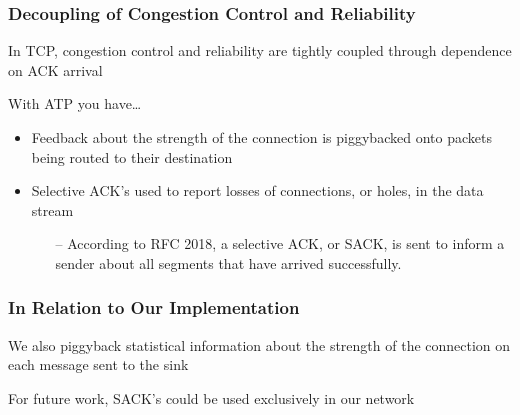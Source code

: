 \begin{frame}[t]
  \frametitle{Decoupling of Congestion Control and Reliability}

  In TCP, congestion control and reliability are tightly coupled through dependence on ACK arrival

  \vfill
  
  With ATP you have\dots

  \begin{itemize}
  \item Feedback about the strength of the connection is piggybacked onto packets being routed to their destination
  \item Selective ACK's used to report losses of connections, or holes, in the data stream
    \begin{itemize}
    \item[--] According to RFC 2018, a selective ACK, or SACK, is sent to inform a sender about all segments that have arrived successfully.
    \end{itemize}
  \end{itemize}

  \vfill

  \begin{flushleft}
    \begin{tiny}
      \begin{minipage}{1.0\linewidth}
      \end{minipage}
    \end{tiny}
  \end{flushleft}
  
\end{frame}
    
\begin{frame}[t]
  \frametitle{In Relation to Our Implementation}

  \vfill
  
  We also piggyback statistical information about the strength of the connection on each message sent to the sink
  \vfill
  
  For future work, SACK's could be used exclusively in our network

  \vspace{\vfill}
  
  \begin{flushleft}
    \begin{tiny}
      \begin{minipage}{1.0\linewidth}
      \end{minipage}
    \end{tiny}
  \end{flushleft}

\end{frame}
